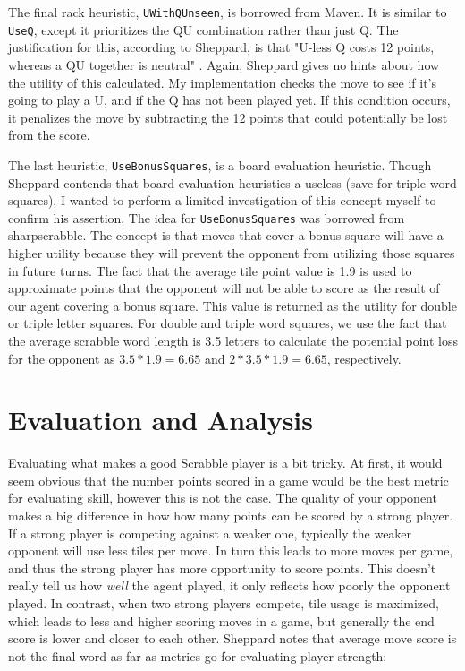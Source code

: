 \documentclass[letterpaper]{article}
\begin{document}
The final rack heuristic, \texttt{UWithQUnseen}, is borrowed from Maven. It is similar to \texttt{UseQ}, except it prioritizes the QU combination rather than just Q. The justification for this, according to Sheppard, is that "U-less Q costs 12 points, whereas a QU together is neutral" \cite{1sheppard2002}. Again, Sheppard gives no hints about how the utility of this calculated. My implementation checks the move to see if it's going to play a U, and if the Q has not been played yet. If this condition occurs, it penalizes the move by subtracting the 12 points that could potentially be lost from the score.

The last heuristic, \texttt{UseBonusSquares}, is a board evaluation heuristic. Though Sheppard contends that board evaluation heuristics a useless (save for triple word squares), I wanted to perform a limited investigation of this concept myself to confirm his assertion. The idea for \texttt{UseBonusSquares} was borrowed from sharpscrabble. The concept is that moves that cover a bonus square will have a higher utility because they will prevent the opponent from utilizing those squares in future turns. The fact that the average tile point value is 1.9 is used to approximate points that the opponent will not be able to score as the result of our agent covering a bonus square. This value is returned as the utility for double or triple letter squares. For double and triple word squares, we use the fact that the average scrabble word length is 3.5 letters to calculate the potential point loss for the opponent as $3.5 * 1.9 = 6.65$ and $2* 3.5 * 1.9 = 6.65$, respectively.


\section{Evaluation and Analysis}
Evaluating what makes a good Scrabble player is a bit tricky. At first, it would seem obvious that the number points scored in a game would be the best metric for evaluating skill, however this is not the case. The quality of your opponent makes a big difference in how how many points can be scored by a strong player. If a strong player is competing against a weaker one, typically the weaker opponent will use less tiles per move. In turn this leads to more moves per game, and thus the strong player has more opportunity to score points. This doesn't really tell us how \emph{well} the agent played, it only reflects how poorly the opponent played. In contrast, when two strong players compete, tile usage is maximized, which leads to less and higher scoring moves in a game, but generally the end score is lower and closer to each other. Sheppard notes that average move score is not the final word as far as metrics go for evaluating player strength:
\end{document}
